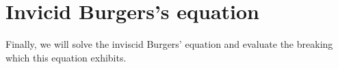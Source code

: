 \section{Invicid Burgers's equation}

Finally, we will solve the inviscid Burgers' equation and evaluate the breaking which this equation exhibits. 

\begin{figure}[ht]
    \centering
    
\end{figure}
